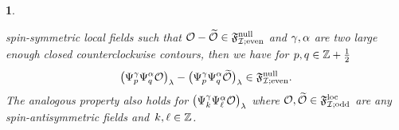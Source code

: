 \documentclass[12pt,oneside,english]{amsart}
\numberwithin{equation}{section}
\numberwithin{figure}{section}
\theoremstyle{plain}
\theoremstyle{plain}
\theoremstyle{plain}
\theoremstyle{plain}
\newtheorem{lem}[thm]{\protect\lemmaname}
\theoremstyle{remark}
\theoremstyle{definition}
\theoremstyle{plain}
\theoremstyle{plain}
\numberwithin{thm}{section}
\providecommand{\lemmaname}{Lemma}
\providecommand{\lemmaname}{Lemma}
\providecommand{\lemmaname}{Lemma}
\providecommand{\lemmaname}{Lemma}
\begin{document}
\begin{lem}
\begin{itemize}
spin-symmetric local fields such that
${\mathcal{O}} - \widetilde{{\mathcal{O}}} \in \mathfrak{F}^\mathrm{null}_{\mathcal{I}; \mathrm{even}}$ and 
$\gamma, \alpha$ are two large enough closed counterclockwise contours, 
then we have for $p,q \in \mathbb{Z} + \frac{1}{2}$
\[ \big( {\Psi}^{\gamma}_{p} {\Psi}^{\alpha}_{q}
    {\mathcal{O}} \big)_{{\lambda}} -
\big( {\Psi}^{\gamma}_{p} {\Psi}^{\alpha}_{q}
    \widetilde{{\mathcal{O}}} \big)_{{\lambda}} \in \mathfrak{F}^\mathrm{null}_{\mathcal{I}; \mathrm{even}} . \]
The analogous property also holds for
$\big( {\Psi}^{\gamma}_{k} {\Psi}^{\alpha}_{\ell}
    {\mathcal{O}} \big)_{{\lambda}}$
where ${{\mathcal{O}}, \widetilde{{\mathcal{O}}} \in \mathfrak{F}^\mathrm{loc}_{\mathcal{I}; \mathrm{odd}}}$
are any spin-antisymmetric fields and~$k,\ell \in \mathbb{Z}$.
\end{itemize}
% 
\end{lem}
\end{document}

